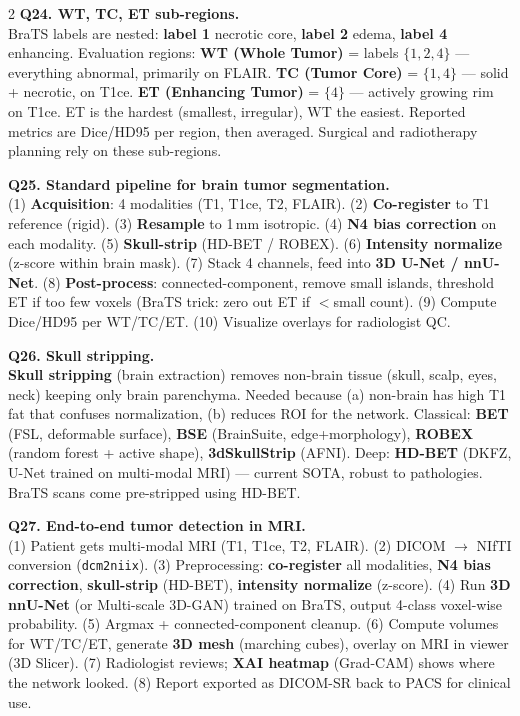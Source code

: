 \begin{paracol}{2}
\textbf{Q24. WT, TC, ET sub-regions.}\\
BraTS labels are nested: \textbf{label 1} necrotic core, \textbf{label 2} edema, \textbf{label 4} enhancing. Evaluation regions: \textbf{WT (Whole Tumor)} = labels $\{1,2,4\}$ — everything abnormal, primarily on FLAIR. \textbf{TC (Tumor Core)} = $\{1,4\}$ — solid + necrotic, on T1ce. \textbf{ET (Enhancing Tumor)} = $\{4\}$ — actively growing rim on T1ce. ET is the hardest (smallest, irregular), WT the easiest. Reported metrics are Dice/HD95 per region, then averaged. Surgical and radiotherapy planning rely on these sub-regions.

\textbf{Q25. Standard pipeline for brain tumor segmentation.}\\
(1) \textbf{Acquisition}: 4 modalities (T1, T1ce, T2, FLAIR). (2) \textbf{Co-register} to T1 reference (rigid). (3) \textbf{Resample} to 1\,mm isotropic. (4) \textbf{N4 bias correction} on each modality. (5) \textbf{Skull-strip} (HD-BET / ROBEX). (6) \textbf{Intensity normalize} (z-score within brain mask). (7) Stack 4 channels, feed into \textbf{3D U-Net / nnU-Net}. (8) \textbf{Post-process}: connected-component, remove small islands, threshold ET if too few voxels (BraTS trick: zero out ET if $<$small count). (9) Compute Dice/HD95 per WT/TC/ET. (10) Visualize overlays for radiologist QC.

\textbf{Q26. Skull stripping.}\\
\textbf{Skull stripping} (brain extraction) removes non-brain tissue (skull, scalp, eyes, neck) keeping only brain parenchyma. Needed because (a) non-brain has high T1 fat that confuses normalization, (b) reduces ROI for the network. Classical: \textbf{BET} (FSL, deformable surface), \textbf{BSE} (BrainSuite, edge+morphology), \textbf{ROBEX} (random forest + active shape), \textbf{3dSkullStrip} (AFNI). Deep: \textbf{HD-BET} (DKFZ, U-Net trained on multi-modal MRI) — current SOTA, robust to pathologies. BraTS scans come pre-stripped using HD-BET.

\textbf{Q27. End-to-end tumor detection in MRI.}\\
(1) Patient gets multi-modal MRI (T1, T1ce, T2, FLAIR). (2) DICOM $\to$ NIfTI conversion (\texttt{dcm2niix}). (3) Preprocessing: \textbf{co-register} all modalities, \textbf{N4 bias correction}, \textbf{skull-strip} (HD-BET), \textbf{intensity normalize} (z-score). (4) Run \textbf{3D nnU-Net} (or Multi-scale 3D-GAN) trained on BraTS, output 4-class voxel-wise probability. (5) Argmax + connected-component cleanup. (6) Compute volumes for WT/TC/ET, generate \textbf{3D mesh} (marching cubes), overlay on MRI in viewer (3D Slicer). (7) Radiologist reviews; \textbf{XAI heatmap} (Grad-CAM) shows where the network looked. (8) Report exported as DICOM-SR back to PACS for clinical use.


\end{paracol}
